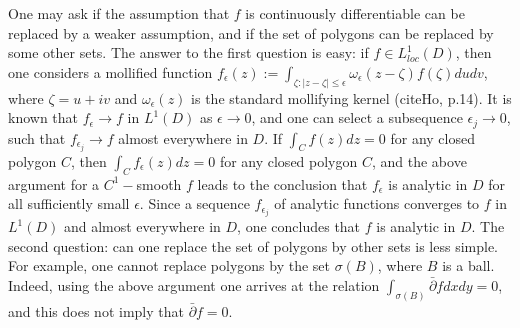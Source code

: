 \documentclass[12pt,leqno]{article}
\begin{document}
One may ask if the assumption that $f$ is continuously differentiable can
be replaced by a weaker assumption, and if the set of polygons can be
replaced by some other sets. The answer to the first question is easy:
if $f\in L^1_{loc}(D)$, then one considers a mollified function
$f_\epsilon(z):=\int_{\zeta: |z-\zeta|\le
\epsilon}\omega_\epsilon(z-\zeta)f(\zeta)dudv$, where $\zeta=u+iv$ and
$\omega_\epsilon(z)$ is the standard mollifying kernel (cite{Ho}, p.14).
It is known that $f_\epsilon\to f$ in $L^1(D)$ as $\epsilon \to 0$, and
one can select a subsequence $\epsilon_j\to 0$, such that
$f_{\epsilon_j}\to f$ almost everywhere in $D$. If
$\int_Cf(z)dz=0$ for any closed polygon $C$, then
$\int_Cf_\epsilon(z)dz=0$ for any closed polygon $C$, and the above
argument for a $C^1-$smooth $f$ leads to the conclusion that
$f_\epsilon$ is analytic in $D$ for all sufficiently small $\epsilon$.
Since a sequence $f_{\epsilon_j}$ of analytic functions
converges to $f$ in $L^1(D)$ and almost everywhere in $D$,
one concludes that $f$ is analytic in $D$. The second question:
can one replace the set of polygons by other sets is less simple.
For example,  one cannot replace polygons by the set $\sigma(B)$,
where $B$ is a ball. Indeed, using the above argument one arrives
at the relation $\int_{\sigma(B)}\bar{\partial}fdxdy=0$, and this does not
imply that $\bar{\partial}f=0$.














\newpage
\end{document}
